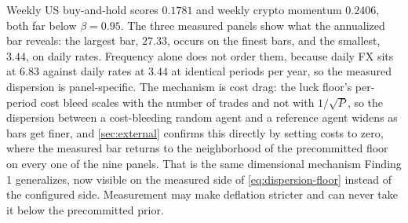 Weekly US buy-and-hold scores $0.1781$ and weekly crypto momentum $0.2406$, both far below $\beta=0.95$. The three measured panels show what the annualized bar reveals: the largest bar, $27.33$, occurs on the finest bars, and the smallest, $3.44$, on daily rates. Frequency alone does not order them, because daily FX sits at $6.83$ against daily rates at $3.44$ at identical periods per year, so the measured dispersion is panel-specific. The mechanism is cost drag: the luck floor's per-period cost bleed scales with the number of trades and not with $1/\sqrt{P}$, so the dispersion between a cost-bleeding random agent and a reference agent widens as bars get finer, and \cref{sec:external} confirms this directly by setting costs to zero, where the measured bar returns to the neighborhood of the precommitted floor on every one of the nine panels. That is the same dimensional mechanism Finding 1 generalizes, now visible on the measured side of \cref{eq:dispersion-floor} instead of the configured side. Measurement may make deflation stricter and can never take it below the precommitted prior.

